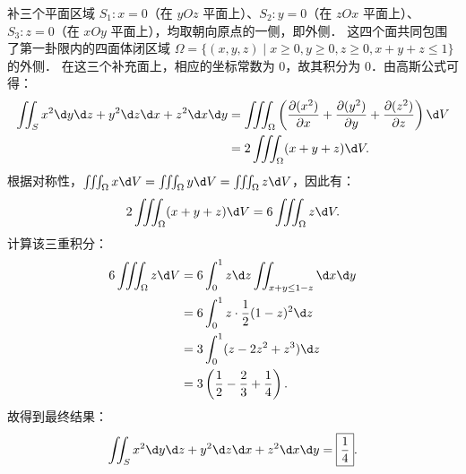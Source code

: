 \begin{solution}
    补三个平面区域 $S_1: x = 0$（在 $yOz$ 平面上）、$S_2: y = 0$（在 $zOx$ 平面上）、$S_3: z = 0$（在 $xOy$ 平面上），均取朝向原点的一侧，即外侧．
    这四个面共同包围了第一卦限内的四面体闭区域 $\Omega = \{ (x,y,z) \mid x \ge 0, y \ge 0, z \ge 0, x+y+z \le 1 \}$ 的外侧．
    在这三个补充面上，相应的坐标常数为 $0$，故其积分为 $0$．由高斯公式可得：
    \begin{equation}
        \label{eq:tetrahedron-1}
        \begin{aligned}
            \iint_{S} x^2 \d y \d z + y^2 \d z \d x + z^2 \d x \d y & = \iiint_{\Omega} \left( \frac{\partial(x^2)}{\partial x} + \frac{\partial(y^2)}{\partial y} + \frac{\partial(z^2)}{\partial z} \right) \d V \\
                                                                    & = 2 \iiint_{\Omega} (x + y + z) \d V.
        \end{aligned}
    \end{equation}
    根据对称性，$\iiint_{\Omega} x \d V = \iiint_{\Omega} y \d V = \iiint_{\Omega} z \d V$，因此有：
    \begin{equation}
        \label{eq:tetrahedron-2}
        2 \iiint_{\Omega} (x + y + z) \d V = 6 \iiint_{\Omega} z \d V.
    \end{equation}
    计算该三重积分：
    \begin{equation}
        \label{eq:tetrahedron-3}
        \begin{aligned}
            6 \iiint_{\Omega} z \d V & = 6 \int_0^1 z \d z \iint_{x+y \le 1-z} \d x \d y           \\
                                     & = 6 \int_0^1 z \cdot \frac{1}{2} (1 - z)^2 \d z             \\
                                     & = 3 \int_0^1 (z - 2z^2 + z^3) \d z                          \\
                                     & = 3 \left( \frac{1}{2} - \frac{2}{3} + \frac{1}{4} \right).
        \end{aligned}
    \end{equation}
    故得到最终结果：
    \begin{equation}
        \label{eq:tetrahedron-4}
        \iint_{S} x^2 \d y \d z + y^2 \d z \d x + z^2 \d x \d y = \boxed{\frac{1}{4}}.
    \end{equation}



\end{solution}

